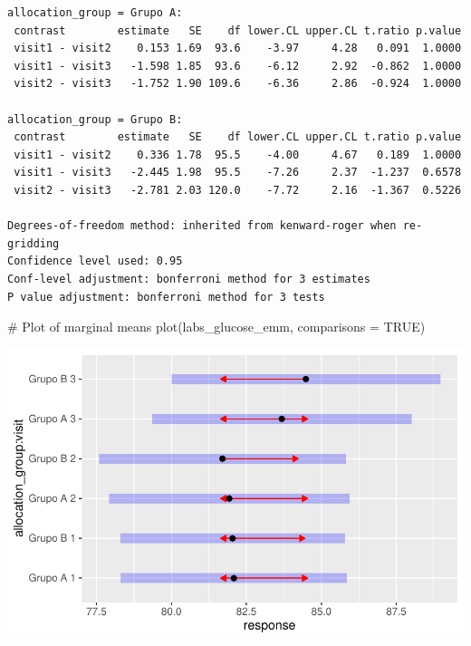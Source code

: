 \documentclass[
  letterpaper,
  DIV=11,
  numbers=noendperiod]{scrartcl}
\newenvironment{Shaded}{\begin{snugshade}}{\end{snugshade}}
\newcommand{\AttributeTok}[1]{\textcolor[rgb]{0.40,0.45,0.13}{#1}}
\newcommand{\CommentTok}[1]{\textcolor[rgb]{0.37,0.37,0.37}{#1}}
\newcommand{\ConstantTok}[1]{\textcolor[rgb]{0.56,0.35,0.01}{#1}}
\newcommand{\FunctionTok}[1]{\textcolor[rgb]{0.28,0.35,0.67}{#1}}
\newcommand{\NormalTok}[1]{\textcolor[rgb]{0.00,0.23,0.31}{#1}}
\begin{document}
\begin{verbatim}
allocation_group = Grupo A:
 contrast        estimate   SE    df lower.CL upper.CL t.ratio p.value
 visit1 - visit2    0.153 1.69  93.6    -3.97     4.28   0.091  1.0000
 visit1 - visit3   -1.598 1.85  93.6    -6.12     2.92  -0.862  1.0000
 visit2 - visit3   -1.752 1.90 109.6    -6.36     2.86  -0.924  1.0000

allocation_group = Grupo B:
 contrast        estimate   SE    df lower.CL upper.CL t.ratio p.value
 visit1 - visit2    0.336 1.78  95.5    -4.00     4.67   0.189  1.0000
 visit1 - visit3   -2.445 1.98  95.5    -7.26     2.37  -1.237  0.6578
 visit2 - visit3   -2.781 2.03 120.0    -7.72     2.16  -1.367  0.5226

Degrees-of-freedom method: inherited from kenward-roger when re-gridding 
Confidence level used: 0.95 
Conf-level adjustment: bonferroni method for 3 estimates 
P value adjustment: bonferroni method for 3 tests 
\end{verbatim}

\begin{Shaded}
\begin{Highlighting}[]
\CommentTok{\# Plot of marginal means}
\FunctionTok{plot}\NormalTok{(labs\_glucose\_emm, }\AttributeTok{comparisons =} \ConstantTok{TRUE}\NormalTok{)}
\end{Highlighting}
\end{Shaded}

\includegraphics{Outcomes_V1V2V3_files/figure-pdf/labs_glucose_sens_emm-1.pdf}
\end{document}
